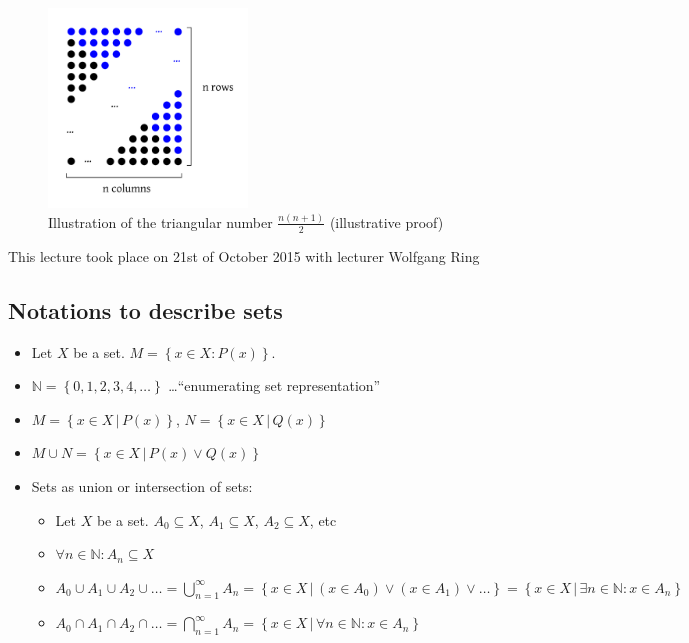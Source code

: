 \documentclass[a4paper,landscape,twocolumn]{article}
\theoremstyle{definition}
\newcommand\set[1]{\left\{#1\right\}}
\newcommand\setdef[2]{\left\{#1\,|\,#2\right\}}
\newcommand\meta[3]{\begin{mdframed}[skipbelow=4pt,skipabove=4pt,innermargin=1pt,innerleftmargin=1pt,innerrightmargin=1pt]\begin{center}\small{\textdownarrow{} This #1 took place on #2 with lecturer #3}\end{center}\end{mdframed}}
\begin{document}
\begin{figure}[!h]
  \begin{center}
    \includegraphics[width=200px]{img/triangular_number.pdf}
    \caption{Illustration of the triangular number $\frac{n (n+1)}{2}$ (illustrative proof)}
  \end{center}
\end{figure}

\meta{lecture}{21st of October 2015}{Wolfgang Ring}

\subsection{Notations to describe sets}

\begin{itemize}
  \item Let $X$ be a set. $M = \set{x \in X: P(x)}$.
  \item $\mathbb N = \set{0,1,2,3,4, \dots}$ \dots \enquote{enumerating set representation}
  \item $M = \setdef{x \in X}{P(x)}$, $N = \setdef{x \in X}{Q(x)}$
  \item $M \cup N = \setdef{x \in X}{P(x) \lor Q(x)}$
  \item Sets as union or intersection of sets:
    \begin{itemize}
      \item Let $X$ be a set. $A_0 \subseteq X$, $A_1 \subseteq X$, $A_2 \subseteq X$, etc
      \item $\forall n \in \mathbb N: A_n \subseteq X$
      \item $A_0 \cup A_1 \cup A_2 \cup \dots = \bigcup_{n=1}^\infty A_{n} = \setdef{x \in X}{(x \in A_0) \lor (x \in A_1) \lor \dots} = \setdef{x \in X}{\exists n \in \mathbb N: x \in A_n}$
      \item $A_0 \cap A_1 \cap A_2 \cap \dots = \bigcap_{n=1}^\infty A_n = \setdef{x \in X}{\forall n \in \mathbb N: x \in A_n}$
    \end{itemize}
\end{itemize}
\end{document}
